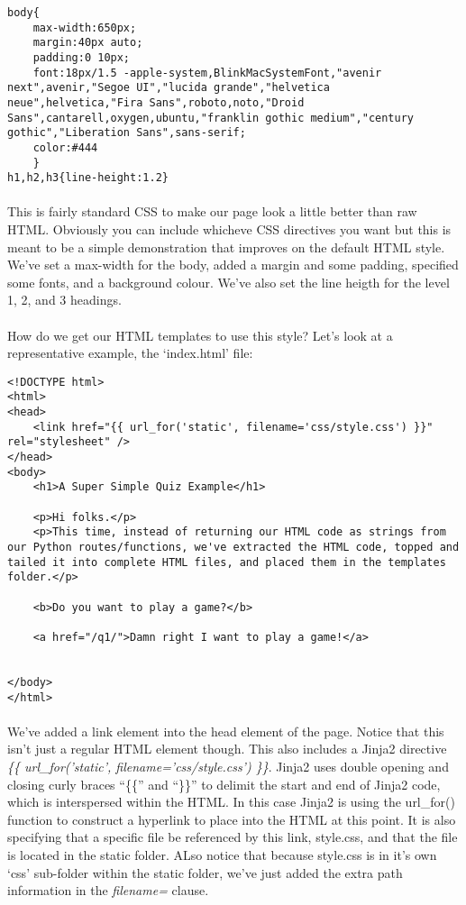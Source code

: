 \begin{lstlisting}
body{
    max-width:650px;
    margin:40px auto;
    padding:0 10px;
    font:18px/1.5 -apple-system,BlinkMacSystemFont,"avenir next",avenir,"Segoe UI","lucida grande","helvetica neue",helvetica,"Fira Sans",roboto,noto,"Droid Sans",cantarell,oxygen,ubuntu,"franklin gothic medium","century gothic","Liberation Sans",sans-serif;
    color:#444
    }
h1,h2,h3{line-height:1.2}

\end{lstlisting}

\paragraph{} This is fairly standard CSS to make our page look a little better than raw HTML. Obviously you can include whicheve CSS directives you want but this is meant to be a simple demonstration that improves on the default HTML style. We've set a max-width for the body, added a margin and some padding, specified some fonts, and a background colour. We've also set the line heigth for the level 1, 2, and 3 headings.

\paragraph{} How do we get our HTML templates to use this style? Let's look at a representative example, the `index.html' file:

\begin{lstlisting}[]
<!DOCTYPE html>
<html>
<head>
    <link href="{{ url_for('static', filename='css/style.css') }}" rel="stylesheet" />
</head>
<body>
    <h1>A Super Simple Quiz Example</h1>

    <p>Hi folks.</p>
    <p>This time, instead of returning our HTML code as strings from our Python routes/functions, we've extracted the HTML code, topped and tailed it into complete HTML files, and placed them in the templates folder.</p>

    <b>Do you want to play a game?</b>

    <a href="/q1/">Damn right I want to play a game!</a>


</body>
</html>
\end{lstlisting}

\paragraph{} We've added a link element into the head element of the page. Notice that this isn't just a regular HTML element though. This also includes a Jinja2 directive \emph{\{\{ url\_for('static', filename='css/style.css') \}\}}. Jinja2 uses double opening and closing curly braces ``\{\{'' and ``\}\}'' to delimit the start and end of Jinja2 code, which is interspersed within the HTML. In this case Jinja2 is using the url\_for() function to construct a hyperlink to place into the HTML at this point. It is also specifying that a specific file be referenced by this link, style.css, and that the file is located in the static folder. ALso notice that because style.css is in it's own `css' sub-folder within the static folder, we've just added the extra path information in the \emph{filename=} clause.

